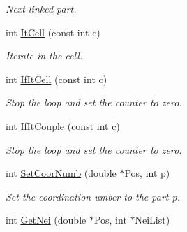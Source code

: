\begin{DoxyCompactItemize}
\begin{DoxyCompactList}\small\item\em Next linked part. \end{DoxyCompactList}\item 
int \hyperlink{classDdLinkedList_af415aae03ca33a44460cc0a84bda0f6d}{It\+Cell} (const int c)\hypertarget{classDdLinkedList_af415aae03ca33a44460cc0a84bda0f6d}{}\label{classDdLinkedList_af415aae03ca33a44460cc0a84bda0f6d}

\begin{DoxyCompactList}\small\item\em Iterate in the cell. \end{DoxyCompactList}\item 
int \hyperlink{classDdLinkedList_a7389c3097a5406135ae60ac38ad141f5}{If\+It\+Cell} (const int c)
\begin{DoxyCompactList}\small\item\em Stop the loop and set the counter to zero. \end{DoxyCompactList}\item 
int \hyperlink{classDdLinkedList_a3896db13faf370f18b2a70c6acd01930}{If\+It\+Couple} (const int c)
\begin{DoxyCompactList}\small\item\em Stop the loop and set the counter to zero. \end{DoxyCompactList}\item 
int \hyperlink{classDdLinkedList_ab8ed71a5fc65abc128da0367f93803c1}{Set\+Coor\+Numb} (double $\ast$Pos, int p)
\begin{DoxyCompactList}\small\item\em Set the coordination umber to the part p. \end{DoxyCompactList}\item 
int \hyperlink{classDdLinkedList_afe0e4e9746cdae570f8c1efdfd04ac16}{Get\+Nei} (double $\ast$Pos, int $\ast$Nei\+List)\hypertarget{classDdLinkedList_afe0e4e9746cdae570f8c1efdfd04ac16}{}\label{classDdLinkedList_afe0e4e9746cdae570f8c1efdfd04ac16}


\end{DoxyCompactItemize}

